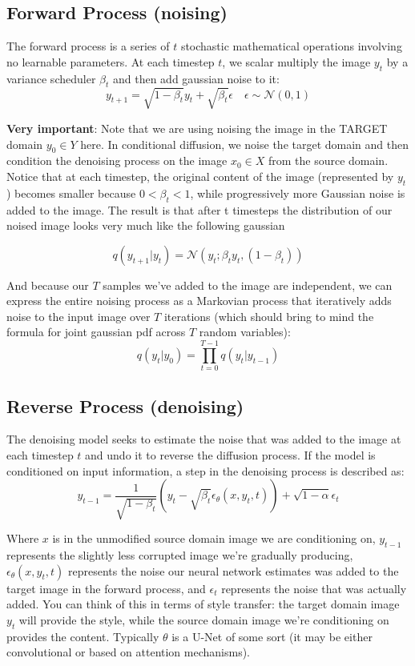 \documentclass[12pt]{article}
\begin{document}
\subsection{Forward Process (noising)}
The forward process is a series of \(t\) stochastic mathematical operations involving no learnable parameters. At each timestep \(t\), we scalar multiply the image \(y_{t}\) by a variance scheduler \(\beta_{t}\) and then add gaussian noise to it:
\[y_ {t+1} = \sqrt{1-\beta_t}y_{t} + \sqrt{\beta_t}\epsilon \quad \epsilon \sim \mathcal{N}(0,1)\]

\textbf{Very important}: Note that we are using noising the image in the TARGET domain \(y_0 \in Y\) here. In conditional diffusion, we noise the target domain and then condition the denoising process on the image \(x_0 \in X\) from the source domain. \\

Notice that at each timestep, the original content of the image (represented by \(y_t\)) becomes smaller because \(0 < \beta_t < 1\), while progressively more Gaussian noise is added to the image. The result is that after t timesteps the distribution of our noised image looks very much like the following gaussian

\[q(y_{t+1}|y_t) = \mathcal{N}(y_t; \beta_ty_t, (1-\beta_t))\]

And because our \(T\) samples we've added to the image are independent, we can express the entire noising process as a Markovian process that iteratively adds noise to the input image over \(T\) iterations (which should bring to mind the formula for joint gaussian pdf across \(T\) random variables):
\[q(y_t | y_{0}) = \prod_{t=0}^{T-1}q(y_t | y_{t-1})\]

\subsection{Reverse Process (denoising)}

The denoising model seeks to estimate the noise that was added to the image at each timestep \(t\) and undo it to reverse the diffusion process.   If the model is conditioned on input information, a step in the denoising process is described as: 
\[y_{t-1} = \frac{1}{\sqrt{1 - \beta_t}}\left(y_t - \sqrt{\beta_t}\epsilon_\theta(x, y_t, t) \right) + \sqrt{1-\alpha}\epsilon_t\]

Where \(x\) is in the unmodified source domain image we are conditioning on, \(y_{t-1}\) represents the slightly less corrupted image we're gradually producing, \(\epsilon_\theta(x, y_t, t)\) represents the noise our neural network estimates was added to the target image in the forward process, and \(\epsilon_t\) represents the noise that was actually added.  You can think of this in terms of style transfer: the target domain image \(y_t\) will provide the style, while the source domain image we're conditioning on provides the content. Typically \(\theta\) is a U-Net of some sort (it may be either convolutional or based on attention mechanisms).\\
\end{document}
